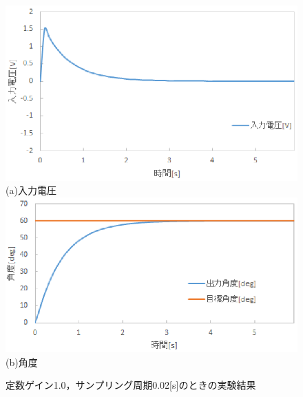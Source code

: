 \documentclass[11pt,a4paper]{jsarticle}
\begin{document}
\begin{figure}[H]
 \begin{center}
  \includegraphics[scale=.6]{./picture/graph2.eps} \\
  (a)入力電圧 \\
  \includegraphics[scale=.6]{./picture/graph1.eps} \\
  (b)角度
  \caption{定数ゲイン1.0，サンプリング周期0.02[s]のときの実験結果}
  \label{fig3}
 \end{center}
\end{figure}
\end{document}
